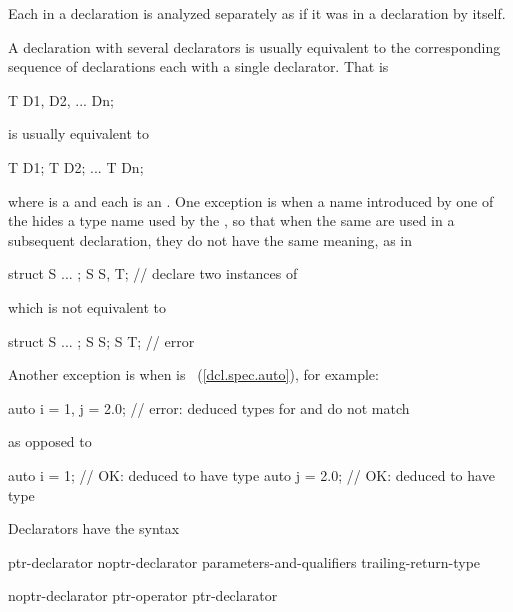 \pnum
Each
in a declaration is analyzed separately as if it was in a declaration by itself.
\begin{note}
A declaration with several declarators is usually equivalent to the corresponding
sequence of declarations each with a single declarator. That is
\begin{codeblock}
T D1, D2, ... Dn;
\end{codeblock}
is usually equivalent to
\begin{codeblock}
T D1; T D2; ... T Dn;
\end{codeblock}
where  is a 
and each  is an .
One exception is when a name introduced by one of the
 hides a type name used by the
, so that when the same
 are used in a subsequent declaration,
they do not have the same meaning, as in
\begin{codeblock}
struct S { ... };
S S, T;                 // declare two instances of 
\end{codeblock}
which is not equivalent to
\begin{codeblock}
struct S { ... };
S S;
S T;                    // error
\end{codeblock}
Another exception is when  is ~(\ref{dcl.spec.auto}),
for example:
\begin{codeblock}
auto i = 1, j = 2.0;    // error: deduced types for  and  do not match
\end{codeblock}
as opposed to
\begin{codeblock}
auto i = 1;             // OK:  deduced to have type 
auto j = 2.0;           // OK:  deduced to have type 
\end{codeblock}
\end{note}

\pnum
Declarators have the syntax

\begin{bnf}
\br
    ptr-declarator\br
    noptr-declarator parameters-and-qualifiers trailing-return-type
\end{bnf}

\begin{bnf}
\br
    noptr-declarator\br
    ptr-operator ptr-declarator
\end{bnf}

